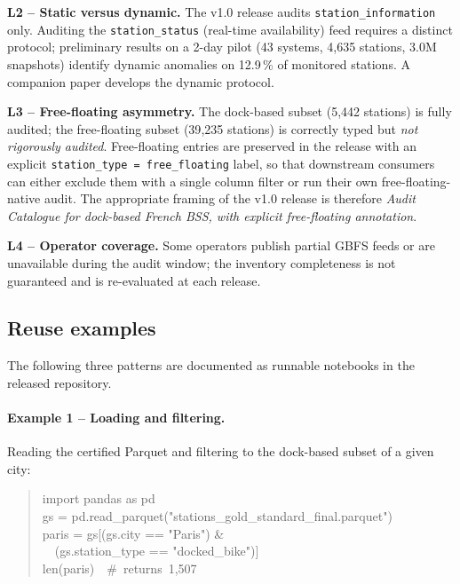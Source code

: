 \documentclass[11pt,a4paper]{article}
\begin{document}
\textbf{L2 -- Static versus dynamic.} The v1.0 release audits
\texttt{station\_information} only. Auditing the
\texttt{station\_status} (real-time availability) feed requires a
distinct protocol; preliminary results on a 2-day pilot
(43 systems, 4{,}635 stations, 3.0M snapshots) identify dynamic
anomalies on 12.9\,\% of monitored stations. A companion paper
\cite{Fosse2026flows} develops the dynamic protocol.

\textbf{L3 -- Free-floating asymmetry.} The dock-based subset
(5{,}442 stations) is fully audited; the free-floating subset
(39{,}235 stations) is correctly typed but \emph{not rigorously
audited}. Free-floating entries are preserved in the release with an
explicit \texttt{station\_type = free\_floating} label, so that
downstream consumers can either exclude them with a single column
filter or run their own free-floating-native audit. The appropriate
framing of the v1.0 release is therefore \emph{Audit Catalogue for
dock-based French BSS, with explicit free-floating annotation}.

\textbf{L4 -- Operator coverage.} Some operators publish partial GBFS
feeds or are unavailable during the audit window; the inventory
completeness is not guaranteed and is re-evaluated at each release.

\subsection{Reuse examples}
The following three patterns are documented as runnable notebooks in
the released repository.

\paragraph{Example 1 -- Loading and filtering.}
Reading the certified Parquet and filtering to the dock-based subset
of a given city:
\begin{quote}\small\ttfamily
import pandas as pd\\
gs = pd.read\_parquet("stations\_gold\_standard\_final.parquet")\\
paris = gs[(gs.city == "Paris") \&\\
\ \ (gs.station\_type == "docked\_bike")]\\
len(paris)\ \ \#\ returns\ 1{,}507
\end{quote}
\end{document}
